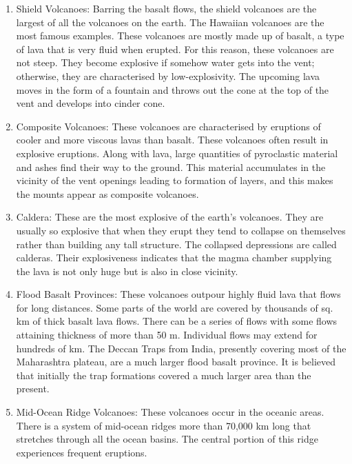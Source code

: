\documentclass[8pt, a4paper, oneside, twocolumn]{extarticle}
\begin{document}
\begin{enumerate}
  \item Shield Volcanoes: Barring the basalt flows, the shield volcanoes are the largest of all the volcanoes on the earth. The Hawaiian volcanoes are the most famous examples. These volcanoes are mostly made up of basalt, a type of lava that is very fluid when erupted. For this reason, these volcanoes are not steep. They become explosive if somehow water gets into the vent; otherwise, they are characterised by low-explosivity. The upcoming lava moves in the form of a fountain and throws out the cone at the top of the vent and develops into cinder cone.
  \item Composite Volcanoes: These volcanoes are characterised by eruptions of cooler and more viscous lavas than basalt. These volcanoes often result in explosive eruptions. Along with lava, large quantities of pyroclastic material and ashes find their way to the ground. This material accumulates in the vicinity of the vent openings leading to formation of layers, and this makes the mounts appear as composite volcanoes.
  \item Caldera: These are the most explosive of the earth’s volcanoes. They are usually so explosive that when they erupt they tend to collapse on themselves rather than building any tall structure. The collapsed depressions are called calderas. Their explosiveness indicates that the magma chamber supplying the lava is not only huge but is also in close vicinity.
  \item Flood Basalt Provinces: These volcanoes outpour highly fluid lava that flows for long distances. Some parts of the world are covered by thousands of sq. km of thick basalt lava flows. There can be a series of flows with some flows attaining thickness of more than 50 m. Individual flows may extend for hundreds of km. The Deccan Traps from India, presently covering most of the Maharashtra plateau, are a much larger flood basalt province. It is believed that initially the trap formations covered a much larger area than the present.
  \item Mid-Ocean Ridge Volcanoes: These volcanoes occur in the oceanic areas. There is a system of mid-ocean ridges more than 70,000 km long that stretches through all the ocean basins. The central portion of this ridge experiences frequent eruptions.
\end{enumerate}
\end{document}
